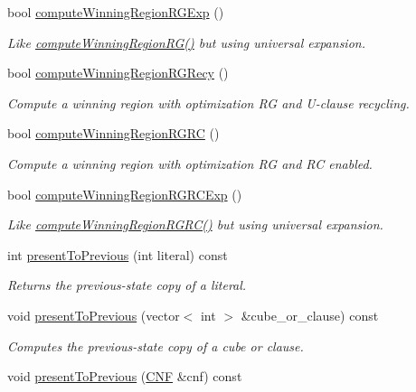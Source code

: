 \begin{DoxyCompactItemize}
bool \hyperlink{classLearnSynthSAT_a2a0513b4d296a1a0fd18e7d03b77b931}{compute\-Winning\-Region\-R\-G\-Exp} ()
\begin{DoxyCompactList}\small\item\em Like \hyperlink{classLearnSynthSAT_aa981048565f10183c30c4dc0576de6b6}{compute\-Winning\-Region\-R\-G()} but using universal expansion. \end{DoxyCompactList}\item 
bool \hyperlink{classLearnSynthSAT_a46b7539bdea0d37bd28bf9ac325057b7}{compute\-Winning\-Region\-R\-G\-Recy} ()
\begin{DoxyCompactList}\small\item\em Compute a winning region with optimization R\-G and U-\/clause recycling. \end{DoxyCompactList}\item 
bool \hyperlink{classLearnSynthSAT_a2d54b84ce5e87b7b2d398226faa501b0}{compute\-Winning\-Region\-R\-G\-R\-C} ()
\begin{DoxyCompactList}\small\item\em Compute a winning region with optimization R\-G and R\-C enabled. \end{DoxyCompactList}\item 
bool \hyperlink{classLearnSynthSAT_ad5683b9e004964720c8fab73fd8ac3e4}{compute\-Winning\-Region\-R\-G\-R\-C\-Exp} ()
\begin{DoxyCompactList}\small\item\em Like \hyperlink{classLearnSynthSAT_a2d54b84ce5e87b7b2d398226faa501b0}{compute\-Winning\-Region\-R\-G\-R\-C()} but using universal expansion. \end{DoxyCompactList}\item 
int \hyperlink{classLearnSynthSAT_ab7a72deebcdf330a28931720d085547d}{present\-To\-Previous} (int literal) const 
\begin{DoxyCompactList}\small\item\em Returns the previous-\/state copy of a literal. \end{DoxyCompactList}\item 
void \hyperlink{classLearnSynthSAT_a5340af48fec2799116e4271eddff6c92}{present\-To\-Previous} (vector$<$ int $>$ \&cube\-\_\-or\-\_\-clause) const 
\begin{DoxyCompactList}\small\item\em Computes the previous-\/state copy of a cube or clause. \end{DoxyCompactList}\item 
void \hyperlink{classLearnSynthSAT_a1062ed5d0994b4fb1453285811d69f53}{present\-To\-Previous} (\hyperlink{classCNF}{C\-N\-F} \&cnf) const 

\end{DoxyCompactItemize}

